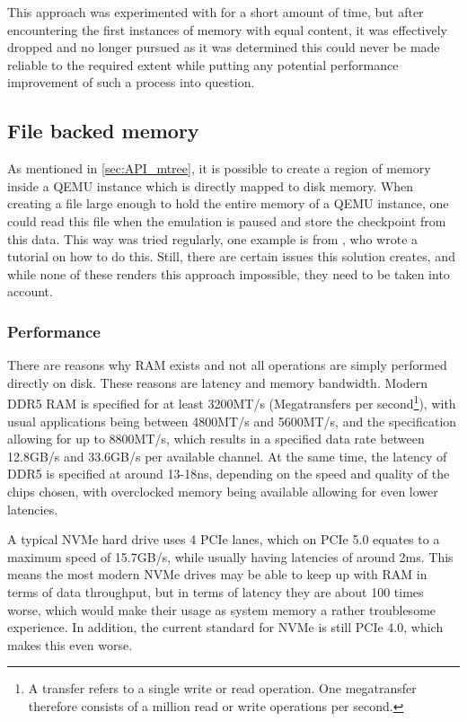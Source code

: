 This approach was experimented with for a short amount of time,
but after encountering the first instances of memory with equal content,
it was effectively dropped and no longer pursued
as it was determined this could never be made reliable to the required extent
while putting any potential performance improvement of such a process into question.

\subsection{File backed memory}
As mentioned in \autoref{sec:API_mtree},
it is possible to create a region of memory inside a QEMU instance
which is directly mapped to disk memory.
When creating a file large enough to hold the entire memory of a QEMU instance,
one could read this file when the emulation is paused and store the checkpoint from this data.
This way was tried regularly, one example is from ,
who wrote a tutorial on how to do this\cite{QEMU_memory_file}.
Still, there are certain issues this solution creates,
and while none of these renders this approach impossible,
they need to be taken into account.

\subsubsection{Performance}
There are reasons why RAM exists and not all operations are simply performed directly on disk.
These reasons are latency and memory bandwidth.
Modern DDR5 RAM is specified for at least 3200MT/s (Megatransfers per second\footnote{A transfer refers to a single write or read operation. One megatransfer therefore consists of a million read or write operations per second.}),
with usual applications being between 4800MT/s and 5600MT/s,
and the specification allowing for up to 8800MT/s,
which results in a specified data rate between 12.8GB/s and 33.6GB/s per available channel.
At the same time, the latency of DDR5 is specified at around 13-18ns,
depending on the speed and quality of the chips chosen,
with overclocked memory being available allowing for even lower latencies\cite[p.392-406]{JEDEC}.

A typical NVMe hard drive uses 4 PCIe lanes, which on PCIe 5.0 equates to a maximum speed of 15.7GB/s,
while usually having latencies of around 2ms.
This means the most modern NVMe drives may be able to keep up with RAM in terms of data throughput,
but in terms of latency they are about 100 times worse,
which would make their usage as system memory a rather troublesome experience.
In addition, the current standard for NVMe is still PCIe 4.0, which makes this even worse.

